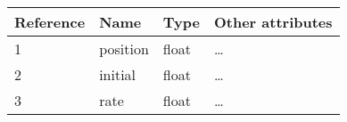 \documentclass{standalone}
\begin{document}
\begin{tabularx}{\textwidth}{XXXX}
    Reference & Name & Type & Other attributes \\
        \midrule
        1 & position & float & \dots \\
        2 & initial & float & \dots \\
        3 & rate & float & \dots \\
\end{tabularx}
\end{document}
